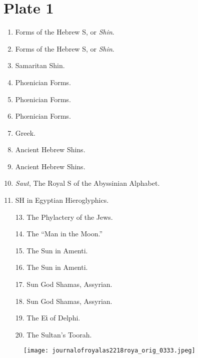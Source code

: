 \documentclass[a4paper, 11pt, oneside, english]{article}
\begin{document}
\section*{Plate 1}
\begin{enumerate}
    \item Forms of the Hebrew S, or \emph{Shin}.

    \item Forms of the Hebrew S, or \emph{Shin}.

    \item Samaritan Shin.

    \item Phœnician Forms.

    \item Phœnician Forms.

    \item Phœnician Forms.

    \item Greek.

    \item Ancient Hebrew Shins.

    \item Ancient Hebrew Shins.

    \item \emph{Saut}, The Royal S of the Abyssinian Alphabet.

    \item SH in Egyptian Hieroglyphics.

    \item[13.] The Phylactery of the Jews.

    \item[14.] The ``Man in the Moon.''

    \item[15.] The Sun in Amenti.

    \item[16.] The Sun in Amenti.

    \item[17.] Sun God Shamas, Assyrian.

    \item[18.] Sun God Shamas, Assyrian.

    \item[19.] The Εὶ of Delphi.

    \item[20.] The Sultan's Toorah.
\end{enumerate}
\vspace*{\fill}  
\clearpage
\vspace*{\fill}  
\begin{figure}[H]
\centering
\texttt{[image: journalofroyalas2218roya\_orig\_0333.jpeg]}
\end{figure}
\vspace*{\fill} 
\clearpage
{}
\vspace*{\fill}  
\end{document}
